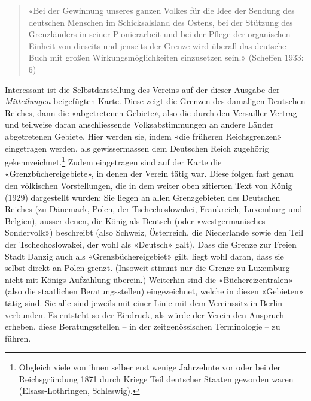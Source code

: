 \documentclass[a4paper,
fontsize=11pt,
oneside,
numbers=noperiodatend,
parskip=half-,
bibliography=totoc,
final
]{scrartcl}
\begin{document}
\begin{quote}
«Bei der Gewinnung unseres ganzen Volkes für die Idee der Sendung des
deutschen Menschen im Schicksalsland des Ostens, bei der Stützung des
Grenzländers in seiner Pionierarbeit und bei der Pflege der organischen
Einheit von dieseits und jenseits der Grenze wird überall das deutsche
Buch mit großen Wirkungsmöglichkeiten einzusetzen sein.» (Scheffen 1933:
6)
\end{quote}

Interessant ist die Selbstdarstellung des Vereins auf der dieser Ausgabe
der \emph{Mitteilungen} beigefügten Karte. Diese zeigt die Grenzen des
damaligen Deutschen Reiches, dann die «abgetretenen Gebiete», also die
durch den Versailler Vertrag und teilweise daran anschliessende
Volksabstimmungen an andere Länder abgetretenen Gebiete. Hier werden
sie, indem «die früheren Reichsgrenzen» eingetragen werden, als
gewissermassen dem Deutschen Reich zugehörig gekennzeichnet.\footnote{Obgleich
  viele von ihnen selber erst wenige Jahrzehnte vor oder bei der
  Reichsgründung 1871 durch Kriege Teil deutscher Staaten geworden waren
  (Elsass-Lothringen, Schleswig).} Zudem eingetragen sind auf der Karte
die «Grenzbüchereigebiete», in denen der Verein tätig war. Diese folgen
fast genau den völkischen Vorstellungen, die in dem weiter oben
zitierten Text von König (1929) dargestellt wurden: Sie liegen an allen
Grenzgebieten des Deutschen Reiches (zu Dänemark, Polen, der
Tschechoslowakei, Frankreich, Luxemburg und Belgien), ausser denen, die
König als Deutsch (oder «westgermanisches Sondervolk») beschreibt (also
Schweiz, Österreich, die Niederlande sowie den Teil der
Tschechoslowakei, der wohl als «Deutsch» galt). Dass die Grenze zur
Freien Stadt Danzig auch als «Grenzbüchereigebiet» gilt, liegt wohl
daran, dass sie selbst direkt an Polen grenzt. (Insoweit stimmt nur die
Grenze zu Luxemburg nicht mit Königs Aufzählung überein.) Weiterhin sind
die «Büchereizentralen» (also die staatlichen Beratungsstellen)
eingezeichnet, welche in diesen «Gebieten» tätig sind. Sie alle sind
jeweils mit einer Linie mit dem Vereinssitz in Berlin verbunden. Es
entsteht so der Eindruck, als würde der Verein den Anspruch erheben,
diese Beratungsstellen -- in der zeitgenössischen Terminologie -- zu
führen.
\end{document}
